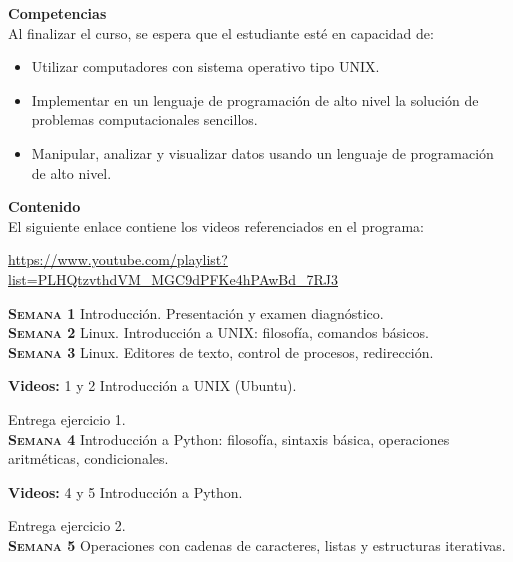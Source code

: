 \documentclass[letterpaper,10pt,onecolumn]{article}
\begin{document}
\noindent\textbf{\large {} \quad Competencias}\\[-0.2cm]

\noindent\normalsize Al finalizar el curso, se espera que el estudiante esté en capacidad de:

\begin{itemize}
	\item Utilizar computadores con sistema operativo tipo UNIX.\\[-0.6cm]
	\item Implementar en un lenguaje de programación de alto nivel la solución de problemas computacionales sencillos.\\[-0.6cm]
	\item Manipular, analizar y visualizar datos usando un lenguaje de programación de alto nivel.\\[-0.2cm]
\end{itemize}

\noindent\textbf{\large {} \quad Contenido}\\[-0.2cm]

El siguiente enlace contiene los videos referenciados en el programa:

\url{https://www.youtube.com/playlist?list=PLHQtzvthdVM_MGC9dPFKe4hPAwBd_7RJ3}

\noindent\normalsize \textbf{\textsc{Semana 1}} Introducción.
Presentación y examen diagnóstico.
\\[-0.3cm] 

\noindent\textbf{\textsc{Semana 2}} Linux.
Introducción a UNIX: filosofía, comandos básicos. 
\\[-0.3cm] 

\noindent\textbf{\textsc{Semana 3}}  Linux. 
Editores de texto, control de procesos, redirección.

\textbf{Videos:} 1 y 2 Introducci\'on a UNIX (Ubuntu).

Entrega ejercicio 1.
\\[-0.3cm]  

\noindent\textbf{\textsc{Semana 4}} Introducción a Python: filosofía,
sintaxis básica, operaciones aritméticas, condicionales.

\textbf{Videos:} 4 y 5 Introducci\'on a Python.

Entrega ejercicio 2.
\\[-0.3cm]   

\noindent\textbf{\textsc{Semana 5}} Operaciones con cadenas de
caracteres, listas y estructuras iterativas.
\end{document}
